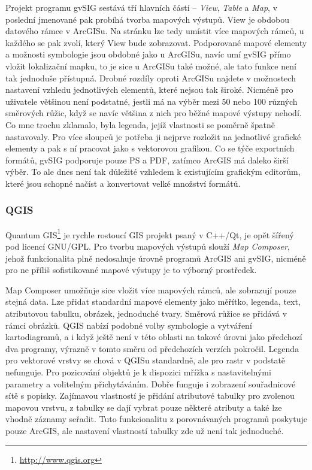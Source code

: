 \documentclass[a4paper,12pt,draft]{article}
\begin{document}
Projekt programu gvSIG sestává tří hlavních částí -- \emph{View},
\emph{Table} a \emph{Map}, v poslední jmenované pak probíhá tvorba
mapových výstupů. View je obdobou datového rámce v ArcGISu. Na stránku
lze tedy umístit více mapových rámců, u každého se pak zvolí,
který View bude zobrazovat. Podporované mapové elementy a možnosti
symbologie jsou obdobné
jako u ArcGISu, navíc umí gvSIG přímo vložit lokalizační mapku,
to je sice u ArcGISu také možné, ale tato funkce není tak jednoduše
přístupná. Drobné rozdíly oproti ArcGISu najdete v možnostech nastavení
vzhledu
jednotlivých elementů, které nejsou tak široké. Nicméně pro uživatele
většinou
není podstatné, jestli má na výběr mezi 50 nebo 100 různých směrových
růžic,
když se navíc  většina z nich  pro běžné mapové výstupy nehodí.
Co mne trochu zklamalo,
byla legenda, jejíž vlastnosti se poměrně špatně nastavovaly. Pro
více sloupců je potřeba ji nejprve rozložit na jednotlivé grafické
elementy a pak s ní pracovat jako s vektorovou grafikou. Co se týče
exportních formátů, gvSIG podporuje pouze PS a PDF, zatímco ArcGIS
má daleko širší výběr. To ale dnes není tak důležité vzhledem
k existujícím grafickým editorům, které jsou schopné načíst a
konvertovat velké množství formátů.

\subsubsection{QGIS}
Quantum GIS\footnote{\url{http://www.qgis.org}} je rychle rostoucí GIS projekt
psaný v C++/Qt, je opět šířený
pod licencí GNU/GPL. Pro tvorbu mapových výstupů slouží \emph{Map
Composer}, jehož funkcionalita plně nedosahuje úrovně programů ArcGIS
ani gvSIG, nicméně pro ne příliš sofistikované mapové výstupy je to
výborný prostředek.

Map Composer umožňuje sice vložit více mapových rámců, ale
zobrazují pouze stejná data. Lze přidat standardní mapové elementy
jako měřítko, legenda, text, atributovou tabulku, obrázek, jednoduché
tvary. Směrová růžice se přidává v rámci obrázků.
QGIS nabízí podobné volby symbologie a vytváření kartodiagramů,
a i když
ještě není v této oblasti na takové úrovni jako předchozí dva
programy, výrazně
v tomto směru od předchozích verzích pokročil.
Legenda pro vektorové vrstvy se chová v QGISu standardně, ale
pro rastr v podstatě nefunguje. Pro pozicování objektů je k dispozici
mřížka s nastavitelnými parametry a volitelným přichytáváním. Dobře
funguje i zobrazení souřadnicové sítě s popisky. Zajímavou
vlastností je přidání atributové tabulky pro zvolenou mapovou
vrstvu, z tabulky se dají vybrat pouze některé atributy a také lze
vhodně záznamy seřadit. Tuto funkcionalitu z porovnávaných programů
poskytuje pouze ArcGIS, ale nastavení vlastností tabulky zde už není
tak jednoduché.
\end{document}
